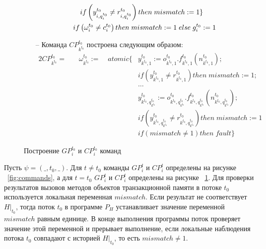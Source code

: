 \begin{myproof}
\begin{figure}
\begin{itemize}
\begin{alignat}{2}
         &&& if \left (y^{t_0}_{i,q^{t_0}_i} \neq r^{t_0}_{i,q^{t_0}_i}\right) then \; mismatch := 1\} \nonumber \\
         &\quad \mathrlap{if \left(\omega^{t_0}_{i} \neq c^{t_0}_{i} \right) then \; mismatch := 1 \; else \; g^{t_0}_{i} := 1} \nonumber
\end{alignat}
\item[--] Команда $CP^{t_0}_{k^{t_0}}$ построена следующим образом:
\begin{alignat}{2}
     CP^{t_0}_{k^{t_0}} =&\quad \omega^{t_0}_{k^{t_0}} := &\; atomic\{&y^{t_0}_{k^{t_0},1} := o^{t_0}_{k^{t_0},1}.f^{t_0}_{k^{t_0},1}(n^{t_0}_{k^{t_0},1}); \nonumber \\ 
     &&& if \left (y^{t_0}_{k^{t_0},1} \neq r^{t_0}_{k^{t_0},1}\right) then \; mismatch := 1; \nonumber \\
         &           &&\ldots \nonumber \\
         & && y^{t_0}_{k^{t_0},q^{t_0}_{k^{t_0}}} := o^{t_0}_{k^{t_0},q^{t_0}_{k^{t_0}}}.f^{t_0}_{k^{t_0},q^{t_0}_{k^{t_0}}}(n^{t_0}_{k^{t_0},q^{t_0}_{k^{t_0}}}); 
         \nonumber \\ 
         &&& if \left (y^{t_0}_{k^{t_0},q^{t_0}_{k^{t_0}}} \neq r^{t_0}_{k^{t_0},q^{t_0}_{k^{t_0}}}\right) then \; mismatch := 1 \nonumber \\
         &&& if \left(mismatch \neq 1 \right) then \; fault \} \nonumber
\end{alignat}
\end{itemize}
\caption{Построение $GP^{t_0}_i$ и $CP^{t_0}_i$ команд}
\label{fig:commands_t0}
\end{figure}

Пусть $\psi = (\_,t_0,\_)$. Для $t \neq t_0$ команды $GP^t_i$ и $CP^t_i$ определены на рисунке ~\ref{fig:commands}, а для $t = t_0$ $GP^t_i$ и $CP^t_i$ определены на рисунке ~\ref{fig:commands_t0}. Для проверки результатов вызовов методов объектов транзакционной памяти в потоке $t_0$ используется локальная переменная $mismatch$. Если результат не соответствует $H|_{t_0}$, тогда поток $t_0$ в программе $P_H$ устанавливает значение переменной $mismatch$ равным единице. В конце выполнения программы поток проверяет значение этой переменной и прерывает выполнение, если локальные наблюдения потока $t_0$ совпадают с историей $H|_{t_0}$, то есть $mismatch \neq 1$.


\end{myproof}
